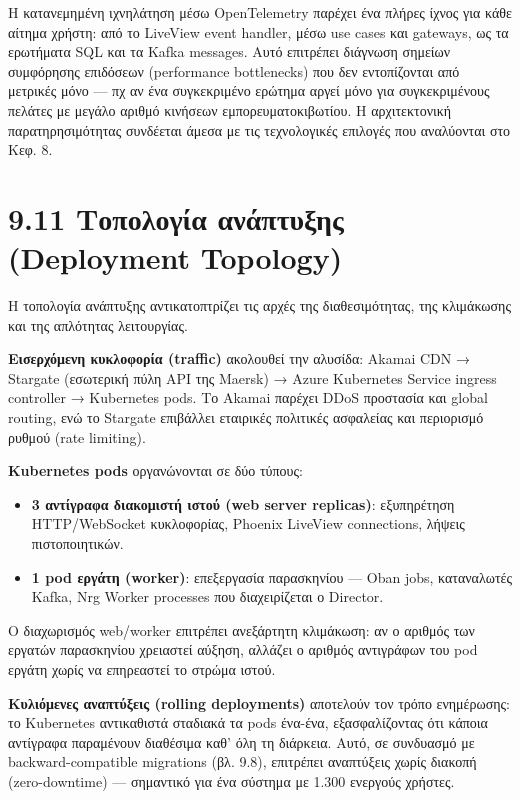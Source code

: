 \documentclass[11pt,a4paper,greek,twoside]{template-xe}
\providecommand{\tightlist}{\setlength{\itemsep}{0pt}\setlength{\parskip}{0pt}}
\begin{document}
Η κατανεμημένη ιχνηλάτηση μέσω OpenTelemetry παρέχει ένα πλήρες ίχνος
για κάθε αίτημα χρήστη: από το LiveView event handler, μέσω use cases
και gateways, ως τα ερωτήματα SQL και τα Kafka messages. Αυτό επιτρέπει
διάγνωση σημείων συμφόρησης επιδόσεων (performance bottlenecks) που δεν
εντοπίζονται από μετρικές μόνο --- πχ αν ένα συγκεκριμένο ερώτημα αργεί
μόνο για συγκεκριμένους πελάτες με μεγάλο αριθμό κινήσεων
εμπορευματοκιβωτίου. Η αρχιτεκτονική παρατηρησιμότητας συνδέεται άμεσα
με τις τεχνολογικές επιλογές που αναλύονται στο Κεφ. 8.

\section{9.11 Τοπολογία ανάπτυξης (Deployment
Topology)}\label{ux3c4ux3bfux3c0ux3bfux3bbux3bfux3b3ux3afux3b1-ux3b1ux3bdux3acux3c0ux3c4ux3c5ux3beux3b7ux3c2-deployment-topology}

Η τοπολογία ανάπτυξης αντικατοπτρίζει τις αρχές της διαθεσιμότητας, της
κλιμάκωσης και της απλότητας λειτουργίας.

\textbf{Εισερχόμενη κυκλοφορία (traffic)} ακολουθεί την αλυσίδα: Akamai
CDN → Stargate (εσωτερική πύλη API της Maersk) → Azure Kubernetes
Service ingress controller → Kubernetes pods. Το Akamai παρέχει DDoS
προστασία και global routing, ενώ το Stargate επιβάλλει εταιρικές
πολιτικές ασφαλείας και περιορισμό ρυθμού (rate limiting).

\textbf{Kubernetes pods} οργανώνονται σε δύο τύπους:

\begin{itemize}
\tightlist
\item
  \textbf{3 αντίγραφα διακομιστή ιστού (web server replicas)}:
  εξυπηρέτηση HTTP/WebSocket κυκλοφορίας, Phoenix LiveView connections,
  λήψεις πιστοποιητικών.
\item
  \textbf{1 pod εργάτη (worker)}: επεξεργασία παρασκηνίου --- Oban jobs,
  καταναλωτές Kafka, Nrg Worker processes που διαχειρίζεται ο Director.
\end{itemize}

Ο διαχωρισμός web/worker επιτρέπει ανεξάρτητη κλιμάκωση: αν ο αριθμός
των εργατών παρασκηνίου χρειαστεί αύξηση, αλλάζει ο αριθμός αντιγράφων
του pod εργάτη χωρίς να επηρεαστεί το στρώμα ιστού.

\textbf{Κυλιόμενες αναπτύξεις (rolling deployments)} αποτελούν τον τρόπο
ενημέρωσης: το Kubernetes αντικαθιστά σταδιακά τα pods ένα-ένα,
εξασφαλίζοντας ότι κάποια αντίγραφα παραμένουν διαθέσιμα καθ' όλη τη
διάρκεια. Αυτό, σε συνδυασμό με backward-compatible migrations (βλ.
9.8), επιτρέπει αναπτύξεις χωρίς διακοπή (zero-downtime) --- σημαντικό
για ένα σύστημα με 1.300 ενεργούς χρήστες.
\end{document}
